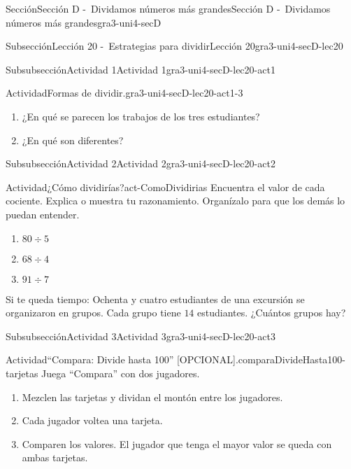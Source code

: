 \documentclass[twoside,14pt,]{extarticle}
\begin{document}
\begin{sectionptx}{Sección}{Sección D -~Dividamos números más grandes}{}{Sección D -~Dividamos números más grandes}{}{}{gra3-uni4-secD}
\begin{subsectionptx}{Subsección}{Lección 20 -~Estrategias para dividir}{}{Lección 20}{}{}{gra3-uni4-secD-lec20}
\begin{subsubsectionptx}{Subsubsección}{Actividad 1}{}{Actividad 1}{}{}{gra3-uni4-secD-lec20-act1}
\begin{activity}{Actividad}{Formas de dividir.}{gra3-uni4-secD-lec20-act1-3}
\begin{enumerate}
\begin{sidebyside}{2}{0}{0}{0}
\begin{sbspanel}{0.5}
Tyler%
\par
\(3\times 20 = 60\)\\
 \(3\times \phantom{0}6 = 18\)\\
 \\
 \(20 + 6 = 26\)%
\end{sbspanel}%
\end{sidebyside}%
\item{}¿En qué se parecen los trabajos de los tres estudiantes?%
\item{}¿En qué son diferentes?%
\end{enumerate}
\end{activity}%
\end{subsubsectionptx}
%
%
\typeout{************************************************}
\typeout{************************************************}
%
\begin{subsubsectionptx}{Subsubsección}{Actividad 2}{}{Actividad 2}{}{}{gra3-uni4-secD-lec20-act2}
\begin{activity}{Actividad}{¿Cómo dividirías?}{act-ComoDividirias}%
Encuentra el valor de cada cociente. Explica o muestra tu razonamiento. Organízalo para que los demás lo puedan entender.%
%
\begin{enumerate}
\item{}\(\displaystyle 80\div 5\)%
\item{}\(\displaystyle 68\div 4\)%
\item{}\(\displaystyle 91\div 7\)%
\end{enumerate}
Si te queda tiempo: Ochenta y cuatro estudiantes de una excursión se organizaron en grupos. Cada grupo tiene \(14\) estudiantes. ¿Cuántos grupos hay?%
\end{activity}%
\end{subsubsectionptx}
%
%
\typeout{************************************************}
\typeout{************************************************}
%
\begin{subsubsectionptx}{Subsubsección}{Actividad 3}{}{Actividad 3}{}{}{gra3-uni4-secD-lec20-act3}
\begin{activity}{Actividad}{“Compara: Divide hasta 100” [OPCIONAL].}{comparaDivideHasta100-tarjetas}%
Juega ``Compara'' con dos jugadores.%
%
\begin{enumerate}
\item{}Mezclen las tarjetas y dividan el montón entre los jugadores.%
\item{}Cada jugador voltea una tarjeta.%
\item{}Comparen los valores. El jugador que tenga el mayor valor se queda con ambas tarjetas.%

\end{enumerate}
\end{activity}
\end{subsubsectionptx}
\end{subsectionptx}
\end{sectionptx}
\end{document}
